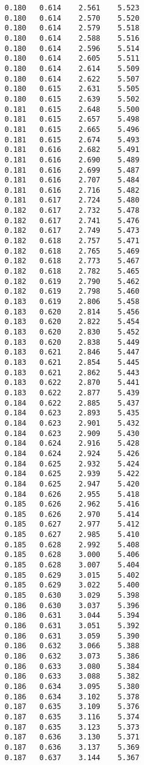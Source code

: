 \begin{verbatim}
   0.180   0.614    2.561    5.523
   0.180   0.614    2.570    5.520
   0.180   0.614    2.579    5.518
   0.180   0.614    2.588    5.516
   0.180   0.614    2.596    5.514
   0.180   0.614    2.605    5.511
   0.180   0.614    2.614    5.509
   0.180   0.614    2.622    5.507
   0.180   0.615    2.631    5.505
   0.180   0.615    2.639    5.502
   0.181   0.615    2.648    5.500
   0.181   0.615    2.657    5.498
   0.181   0.615    2.665    5.496
   0.181   0.615    2.674    5.493
   0.181   0.616    2.682    5.491
   0.181   0.616    2.690    5.489
   0.181   0.616    2.699    5.487
   0.181   0.616    2.707    5.484
   0.181   0.616    2.716    5.482
   0.181   0.617    2.724    5.480
   0.182   0.617    2.732    5.478
   0.182   0.617    2.741    5.476
   0.182   0.617    2.749    5.473
   0.182   0.618    2.757    5.471
   0.182   0.618    2.765    5.469
   0.182   0.618    2.773    5.467
   0.182   0.618    2.782    5.465
   0.182   0.619    2.790    5.462
   0.182   0.619    2.798    5.460
   0.183   0.619    2.806    5.458
   0.183   0.620    2.814    5.456
   0.183   0.620    2.822    5.454
   0.183   0.620    2.830    5.452
   0.183   0.620    2.838    5.449
   0.183   0.621    2.846    5.447
   0.183   0.621    2.854    5.445
   0.183   0.621    2.862    5.443
   0.183   0.622    2.870    5.441
   0.183   0.622    2.877    5.439
   0.184   0.622    2.885    5.437
   0.184   0.623    2.893    5.435
   0.184   0.623    2.901    5.432
   0.184   0.623    2.909    5.430
   0.184   0.624    2.916    5.428
   0.184   0.624    2.924    5.426
   0.184   0.625    2.932    5.424
   0.184   0.625    2.939    5.422
   0.184   0.625    2.947    5.420
   0.184   0.626    2.955    5.418
   0.185   0.626    2.962    5.416
   0.185   0.626    2.970    5.414
   0.185   0.627    2.977    5.412
   0.185   0.627    2.985    5.410
   0.185   0.628    2.992    5.408
   0.185   0.628    3.000    5.406
   0.185   0.628    3.007    5.404
   0.185   0.629    3.015    5.402
   0.185   0.629    3.022    5.400
   0.185   0.630    3.029    5.398
   0.186   0.630    3.037    5.396
   0.186   0.631    3.044    5.394
   0.186   0.631    3.051    5.392
   0.186   0.631    3.059    5.390
   0.186   0.632    3.066    5.388
   0.186   0.632    3.073    5.386
   0.186   0.633    3.080    5.384
   0.186   0.633    3.088    5.382
   0.186   0.634    3.095    5.380
   0.186   0.634    3.102    5.378
   0.187   0.635    3.109    5.376
   0.187   0.635    3.116    5.374
   0.187   0.635    3.123    5.373
   0.187   0.636    3.130    5.371
   0.187   0.636    3.137    5.369
   0.187   0.637    3.144    5.367

\end{verbatim}

